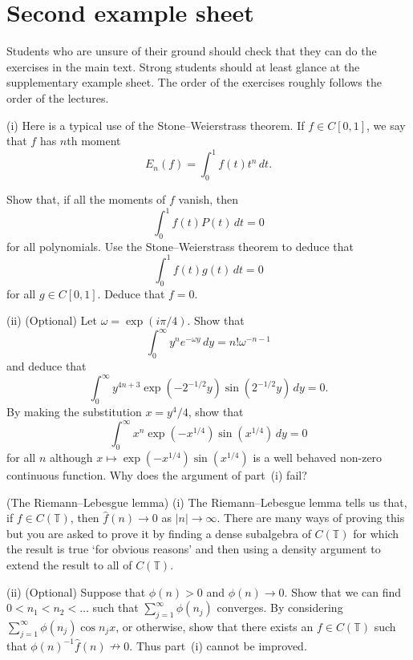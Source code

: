 \section{Second example sheet}
Students who are unsure of  their ground should
check that they can do the exercises in the main text. 
Strong students should at least glance at the supplementary
example sheet. The order of the exercises roughly follows the
order of the lectures.

\begin{exercise}\label{C2.1}
(i) Here is a typical use of the Stone--Weierstrass
theorem. If $f\in C[0,1]$, we say that $f$ has $n$th moment
\[E_{n}(f)=\int_{0}^{1}f(t)t^{n}\,dt.\]

Show that, if all the moments of $f$ vanish, then
\[\int_{0}^{1}f(t)P(t)\,dt=0\]
for all polynomials. Use the Stone--Weierstrass
theorem to deduce that
\[\int_{0}^{1}f(t)g(t)\,dt=0\]
for all $g\in C[0,1]$. Deduce that $f=0$.

(ii) (Optional) Let $\omega=\exp(i\pi/4)$. Show
that
\[\int_{0}^{\infty}y^{n}e^{-\omega y}\,dy=n!\omega^{-n-1}\]
and deduce that
\[\int_{0}^{\infty}y^{4n+3}\exp(-2^{-1/2}y)\sin(2^{-1/2}y)\,dy=0.\]
By making the substitution $x=y^{4}/4$, show that
\[\int_{0}^{\infty}x^{n}\exp(-x^{1/4})\sin(x^{1/4})\,dy=0\]
for all $n$ although $x\mapsto\exp(-x^{1/4})\sin(x^{1/4})$
is a well behaved non-zero continuous function. Why does
the
argument of part~(i) fail?

\end{exercise}
\begin{exercise}\label{E:Riemann--Lebesgue}\label{C2.2} 
(The Riemann--Lebesgue lemma)
(i) The Riemann--Lebesgue lemma tells us that, if $f\in C({\mathbb T})$,
then $\hat{f}(n)\rightarrow 0$ as $|n|\rightarrow\infty$. There
are many ways of proving this but you are asked to prove it by
finding a dense subalgebra of $C({\mathbb T})$ for which
the result is true `for obvious reasons' and then using a density
argument to extend the result to all of $C({\mathbb T})$.

(ii) (Optional) Suppose that $\phi(n)>0$ and $\phi(n)\rightarrow 0$.
Show that we can find $0<n_{1}<n_{2}<\dots$ such that
$\sum_{j=1}^{\infty}\phi(n_{j})$ converges. By considering
$\sum_{j=1}^{\infty}\phi(n_{j})\cos n_{j}x$, or otherwise,
show that there exists an $f\in  C({\mathbb T})$ such that
$\phi(n)^{-1}\hat{f}(n)\nrightarrow 0$. Thus part~(i) cannot be improved.
\end{exercise}
